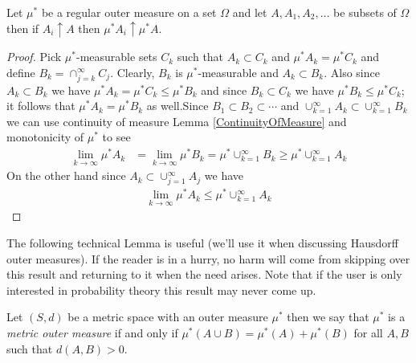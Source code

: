 \begin{prop}\label{ContinuityOfRegularOuterMeasure}Let $\mu^*$ be a regular outer measure on a set $\Omega$ and let $A, A_1,A_2, \dotsc$ be subsets of $\Omega$ then
if $A_i \uparrow A$ then $\mu^* A_i \uparrow \mu^* A$.
\end{prop}
\begin{proof}
Pick $\mu^*$-measurable sets $C_k$ such that $A_k \subset C_k$ and $\mu^* A_k = \mu^* C_k$ and define $B_k = \cap_{j=k}^\infty C_j$.  Clearly, $B_k$ is $\mu^*$-measurable and $A_k \subset B_k$.  Also since $A_k \subset B_k$ we have $\mu^* A_k = \mu^* C_k \leq \mu^* B_k$ and since $B_k \subset C_k$ we have $\mu^* B_k \leq \mu^* C_k$; it follows that $\mu^* A_k = \mu^* B_k$ as well.Since $B_1 \subset B_2 \subset \dotsb$ and $\cup_{k=1}^\infty A_k \subset \cup_{k=1}^\infty B_k$ we can use continuity of measure Lemma \ref{ContinuityOfMeasure} and monotonicity of $\mu^*$ to see
\begin{align*}
\lim_{k \to \infty} \mu^* A_k &= \lim_{k \to \infty} \mu^* B_k = \mu^* \cup_{k=1}^\infty B_k \geq \mu^* \cup_{k=1}^\infty A_k
\end{align*}
On the other hand since $A_k \subset \cup_{j=1}^\infty A_j$ we have
\begin{align*}
\lim_{k \to \infty} \mu^* A_k \leq \mu^* \cup_{k=1}^\infty A_k
\end{align*}
\end{proof}

The following technical Lemma is useful (we'll use it when
discussing Hausdorff outer measures).  If the reader is in a hurry,
no harm will come from skipping over this result and returning to it
when the need arises.  Note that if the user is only interested in
probability theory this result may never come up.

\begin{defn}Let $(S,d)$ be a metric space with an outer measure $\mu^*$ then we say that
$\mu^*$ is a \emph{metric outer measure} if and only if $\mu^*(A \cup B) = \mu^*(A) +
  \mu^*(B)$ for all $A,B$ such that $d(A, B) > 0$.
\end{defn}


